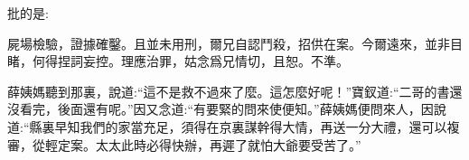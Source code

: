 \begin{parag}
    批的是:
\end{parag}


\begin{qute2sp}
    屍場檢驗，證據確鑿。且並未用刑，爾兄自認鬥殺，招供在案。今爾遠來，並非目睹，何得捏詞妄控。理應治罪，姑念爲兄情切，且恕。不準。
\end{qute2sp}


\begin{parag}
    薛姨媽聽到那裏，說道:“這不是救不過來了麼。這怎麼好呢！”寶釵道:“二哥的書還沒看完，後面還有呢。”因又念道:“有要緊的問來使便知。”薛姨媽便問來人，因說道:“縣裏早知我們的家當充足，須得在京裏謀幹得大情，再送一分大禮，還可以複審，從輕定案。太太此時必得快辦，再遲了就怕大爺要受苦了。”
\end{parag}


